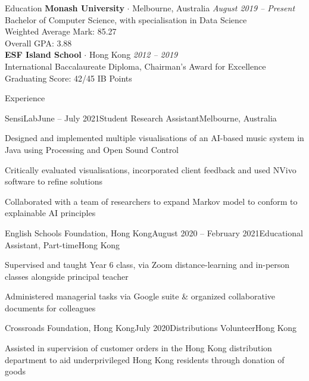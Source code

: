 \documentclass{resume}
\begin{document}
  \begin{rSection}{Education}
    {\bf Monash University} $\cdot$ Melbourne, Australia \hfill {\em August 2019 – Present} \\ 
    { Bachelor of Computer Science, with specialisation in Data Science } \smallskip \\
    Weighted Average Mark: 85.27 \\
    Overall GPA: 3.88 \\
    
    {\bf ESF Island School} $\cdot$ Hong Kong \hfill {\em 2012 – 2019} \\ 
    {International Baccalaureate Diploma, Chairman's Award for Excellence} \smallskip \\
    Graduating Score: 42/45 IB Points
  \end{rSection}
  
  \begin{rSection}{Experience}
  
    \begin{rSubsection}{SensiLab}{June – July 2021}{Student Research Assistant}{Melbourne, Australia}
    \item Designed and implemented multiple visualisations of an AI-based music system in Java using Processing and Open Sound Control
    \item Critically evaluated visualisations, incorporated client feedback and used NVivo software to refine solutions
    \item Collaborated with a team of researchers to expand Markov model to conform to explainable AI principles
    \end{rSubsection}
  
    \begin{rSubsection}{English Schools Foundation, Hong Kong}{August 2020 – February 2021}{Educational Assistant, Part-time}{Hong Kong}
    \item Supervised and taught Year 6 class, via Zoom distance-learning and in-person classes alongside principal teacher
    \item Administered managerial tasks via Google suite \& organized collaborative documents for colleagues
    \end{rSubsection}

    \begin{rSubsection}{Crossroads Foundation, Hong Kong}{July 2020}{Distributions Volunteer}{Hong Kong}
    \item Assisted in supervision of customer orders in the Hong Kong distribution department to aid underprivileged Hong Kong residents through donation of goods
     \end{rSubsection}
  
  \end{rSection}
  
\end{document}
